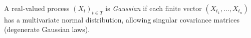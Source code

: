 
A real-valued process $(X_t)_{t\in T}$ is \emph{Gaussian} if each finite vector $(X_{t_1},\ldots,X_{t_n})$ has a multivariate normal distribution, allowing singular covariance matrices (degenerate Gaussian laws).
